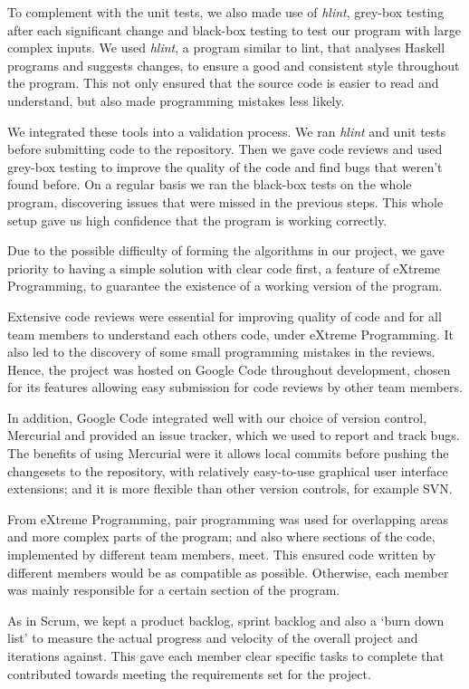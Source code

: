 To complement with the unit tests, we also made use of \emph{hlint}, grey-box testing after each significant change and black-box testing to test our program with large complex inputs. We used \emph{hlint}, a program similar to lint, that analyses Haskell programs and suggests changes, to ensure a good and consistent style throughout the program. This not only ensured that the source code is easier to read and understand, but also made programming mistakes less likely.

We integrated these tools into a validation process. We ran \emph{hlint} and unit tests before submitting code to the repository. Then we gave code reviews and used grey-box testing to improve the quality of the code and find bugs that weren't found before. On a regular basis we ran the black-box tests on the whole program, discovering issues that were missed in the previous steps. This whole setup gave us high confidence that the program is working correctly.

Due to the possible difficulty of forming the algorithms in our project, we gave priority to having a simple solution with clear code first, a feature of eXtreme Programming, to guarantee the existence of a working version of the program.

Extensive code reviews were essential for improving quality of code and for all team members to understand each others code, under eXtreme Programming. It also led to the discovery of some small programming mistakes in the reviews. Hence, the project was hosted on Google Code throughout development, chosen for its features allowing easy submission for code reviews by other team members.

In addition, Google Code integrated well with our choice of version control, Mercurial and provided an issue tracker, which we used to report and track bugs. The benefits of using Mercurial were it allows local commits before pushing the changesets to the repository, with relatively easy-to-use graphical user interface extensions; and it is more flexible than other version controls, for example SVN.

From eXtreme Programming, pair programming was used for overlapping areas and more complex parts of the program; and also where sections of the code, implemented by different team members, meet. This ensured code written by different members would be as compatible as possible. Otherwise, each member was mainly responsible for a certain section of the program.

As in Scrum, we kept a product backlog, sprint backlog and also a `burn down list' to measure the actual progress and velocity of the overall project and iterations against. This gave each member clear specific tasks to complete that contributed towards meeting the requirements set for the project.

